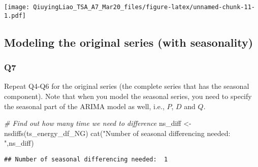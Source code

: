 \documentclass[
]{article}
\newenvironment{Shaded}{\begin{snugshade}}{\end{snugshade}}
\newcommand{\AttributeTok}[1]{\textcolor[rgb]{0.77,0.63,0.00}{#1}}
\newcommand{\CommentTok}[1]{\textcolor[rgb]{0.56,0.35,0.01}{\textit{#1}}}
\newcommand{\DecValTok}[1]{\textcolor[rgb]{0.00,0.00,0.81}{#1}}
\newcommand{\FunctionTok}[1]{\textcolor[rgb]{0.00,0.00,0.00}{#1}}
\newcommand{\NormalTok}[1]{#1}
\newcommand{\OtherTok}[1]{\textcolor[rgb]{0.56,0.35,0.01}{#1}}
\newcommand{\SpecialCharTok}[1]{\textcolor[rgb]{0.00,0.00,0.00}{#1}}
\newcommand{\StringTok}[1]{\textcolor[rgb]{0.31,0.60,0.02}{#1}}
\begin{document}
\begin{Shaded}
\end{Shaded}

\texttt{[image: QiuyingLiao\_TSA\_A7\_Mar20\_files/figure-latex/unnamed-chunk-11-1.pdf]}

\hypertarget{modeling-the-original-series-with-seasonality}{%
\subsection{Modeling the original series (with
seasonality)}\label{modeling-the-original-series-with-seasonality}}

\hypertarget{q7}{%
\subsubsection{Q7}\label{q7}}

Repeat Q4-Q6 for the original series (the complete series that has the
seasonal component). Note that when you model the seasonal series, you
need to specify the seasonal part of the ARIMA model as well, i.e.,
\(P\), \(D\) and \(Q\).

\begin{Shaded}
\begin{Highlighting}[]
\CommentTok{\# Find out how many time we need to difference}
\NormalTok{ns\_diff }\OtherTok{\textless{}{-}} \FunctionTok{nsdiffs}\NormalTok{(ts\_energy\_df\_NG)}
\FunctionTok{cat}\NormalTok{(}\StringTok{"Number of seasonal differencing needed: "}\NormalTok{,ns\_diff)}
\end{Highlighting}
\end{Shaded}

\begin{verbatim}
## Number of seasonal differencing needed:  1
\end{verbatim}
\end{document}
